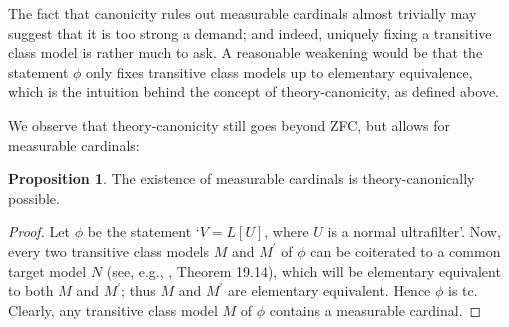 \documentclass[a4paper,12pt]{amsart}
\theoremstyle{definition}
\newtheorem{prop}[fact]{Proposition}
\begin{document}
The fact that canonicity rules out 
measurable cardinals almost trivially may suggest that it is too strong a demand; and indeed, uniquely fixing a transitive class model is rather much to ask.
A reasonable weakening would be that the statement $\phi$ only fixes transitive class models up to elementary equivalence, which is the intuition behind the concept of theory-canonicity, as defined above.

We observe that theory-canonicity still goes beyond ZFC, but allows for measurable cardinals:

\begin{prop}{\label{possible measurables}}
 The existence of measurable cardinals is theory-canonically possible.
\end{prop}
\begin{proof}
 Let $\phi$ be the statement `$V=L[U]$, where $U$ is a normal ultrafilter'. Now, every two transitive class models $M$ and $M^{\prime}$ of $\phi$ can be coiterated to a common target model $N$ (see, e.g., \cite{Je}, Theorem 19.14),
 which will be elementary equivalent to both $M$ and $M^{\prime}$; thus $M$ and $M^{\prime}$ are elementary equivalent. Hence $\phi$ is tc. Clearly, any transitive class model $M$ of $\phi$ 
 contains a measurable cardinal.
\end{proof}
\end{document}
